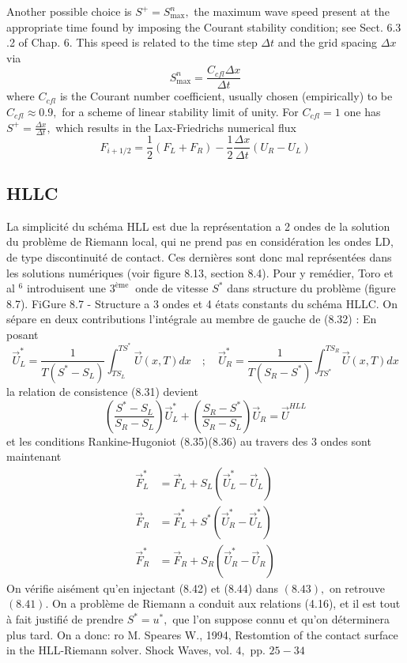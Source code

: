 Another possible choice is $S^{+}=S_{\max }^{n},$ the maximum wave speed present at the appropriate time found by imposing the Courant stability condition; see Sect. 6.3 .2 of Chap. $6 .$ This speed is related to the time step $\Delta t$ and the grid spacing $\Delta x$ via
$$
S_{\max }^{n}=\frac{C_{c f l} \Delta x}{\Delta t}
$$
where $C_{c f l}$ is the Courant number coefficient, usually chosen (empirically) to be $C_{c f l} \approx 0.9,$ for a scheme of linear stability limit of unity. For $C_{c f l}=1$ one has $S^{+}=\frac{\Delta x}{\Delta t},$ which results in the Lax-Friedrichs numerical flux
$$
F_{i+1 / 2}=\frac{1}{2}\left(F_{L}+F_{R}\right)-\frac{1}{2} \frac{\Delta x}{\Delta t}\left(U_{R}-U_{L}\right)
$$

\subsection{HLLC}

La simplicité du schéma HLL est due la représentation a 2 ondes de la solution du problème de Riemann local, qui ne prend pas en considération les ondes LD, de type discontinuité de contact. Ces dernières sont donc mal représentées dans les solutions numériques (voir figure 8.13, section 8.4). Pour y remédier, Toro et al $^{6}$ introduisent une $3^{\text {ème }}$ onde de vitesse $S^{*}$ dans structure du problème (figure 8.7).
FiGure 8.7 - Structure a 3 ondes et 4 états constants du schéma HLLC.
On sépare en deux contributions l'intégrale au membre de gauche de (8.32) :
En posant
$$
\vec{U}_{L}^{*}=\frac{1}{T\left(S^{*}-S_{L}\right)} \int_{T S_{L}}^{T S^{*}} \vec{U}(x, T) d x \quad ; \quad \vec{U}_{R}^{*}=\frac{1}{T\left(S_{R}-S^{*}\right)} \int_{T S^{*}}^{T S_{R}} \vec{U}(x, T) d x
$$
la relation de consistence (8.31) devient
$$
\left(\frac{S^{*}-S_{L}}{S_{R}-S_{L}}\right) \vec{U}_{L}^{*}+\left(\frac{S_{R}-S^{*}}{S_{R}-S_{L}}\right) \vec{U}_{R}=\vec{U}^{H L L}
$$
et les conditions Rankine-Hugoniot (8.35)(8.36) au travers des 3 ondes sont maintenant
$$
\begin{aligned}
\vec{F}_{L}^{*} &=\vec{F}_{L}+S_{L}\left(\vec{U}_{L}^{*}-\vec{U}_{L}\right) \\
\vec{F}_{R} &=\vec{F}_{L}^{*}+S^{*}\left(\vec{U}_{R}^{*}-\vec{U}_{L}^{*}\right) \\
\vec{F}_{R}^{*} &=\vec{F}_{R}+S_{R}\left(\vec{U}_{R}^{*}-\vec{U}_{R}\right)
\end{aligned}
$$
On vérifie aisément qu'en injectant (8.42) et (8.44) dans $(8.43),$ on retrouve $(8.41) .$ On a
problème de Riemann a conduit aux relations (4.16), et il est tout à fait justifié de prendre $S^{*}=u^{*},$ que l'on suppose connu et qu'on déterminera plus tard. On a donc:
ro
M. Speares W., 1994, Restomtion of the contact surface in the HLL-Riemann solver. Shock Waves, vol. $4,$ pp. $25-34$

